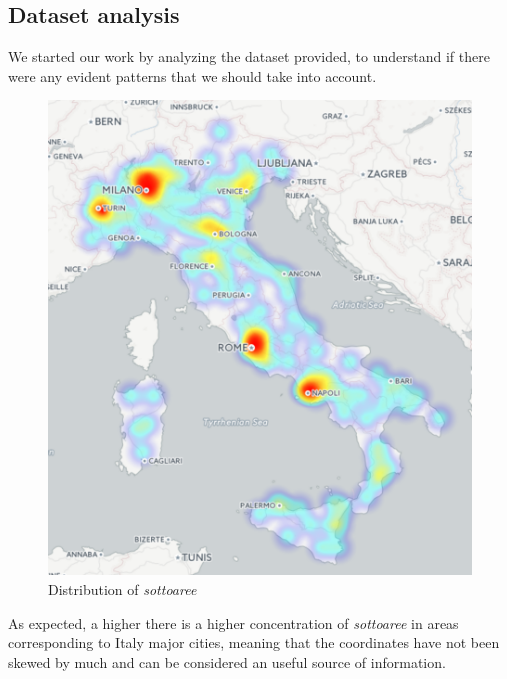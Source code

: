 \documentclass{acm_proc_article-sp}
\begin{document}
\subsection{Dataset analysis}
We started our work by analyzing the dataset provided, to understand if there were any evident patterns that we should take into account.
\begin{figure}[h]
\centering
\includegraphics[width=1\linewidth]{heatmap_sottoaree.png}
\caption{Distribution of \textit{sottoaree}}
\end{figure}
As expected, a higher there is a higher concentration of \textit{sottoaree} in areas corresponding to Italy major cities, meaning that the coordinates have not been skewed by much and can be considered an useful source of information.
\end{document}
